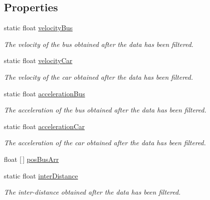 \subsection*{Properties}
\begin{DoxyCompactItemize}
\item 
static float \hyperlink{classmonitoring_aa1b0006663cd5ba0712be4d8a7456638}{velocity\+Bus}
\begin{DoxyCompactList}\small\item\em The velocity of the bus obtained after the data has been filtered.\end{DoxyCompactList}\item 
static float \hyperlink{classmonitoring_aa6614515aa744b660b183fef95c22dbd}{velocity\+Car}
\begin{DoxyCompactList}\small\item\em The velocity of the car obtained after the data has been filtered.\end{DoxyCompactList}\item 
static float \hyperlink{classmonitoring_aa570e9f19b8dac133c43bb5f3c1ae2a3}{acceleration\+Bus}
\begin{DoxyCompactList}\small\item\em The acceleration of the bus obtained after the data has been filtered.\end{DoxyCompactList}\item 
static float \hyperlink{classmonitoring_aaaf8354f9953bda4e43e4f0b66923467}{acceleration\+Car}
\begin{DoxyCompactList}\small\item\em The acceleration of the car obtained after the data has been filtered.\end{DoxyCompactList}\item 
float \mbox{[}$\,$\mbox{]} \hyperlink{classmonitoring_a9fdc2f6e44aff0f03ff05a1cfa2f9d79}{pos\+Bus\+Arr}
\item 
static float \hyperlink{classmonitoring_a8e2c4ef74df749bdc13e8a29c066eb6b}{inter\+Distance}
\begin{DoxyCompactList}\small\item\em The inter-\/distance obtained after the data has been filtered.\end{DoxyCompactList}\end{DoxyCompactItemize}
